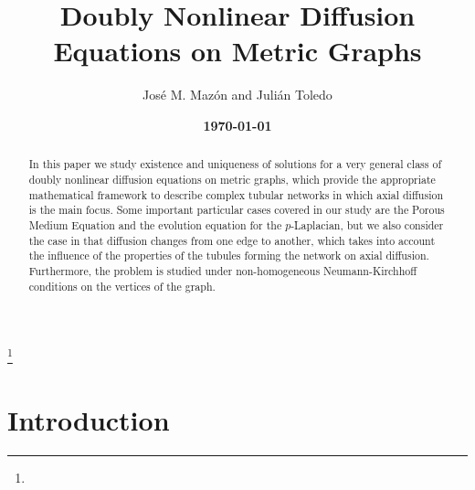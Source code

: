 \documentclass[reqno,12pt]{amsart}
\def\blue{\color{blue}}
\numberwithin{equation}{section} %
\begin{document}
\title[Nonlinear diffusion on metric graphs]{\bf Doubly Nonlinear Diffusion  Equations  on Metric Graphs}


\author[J. M. Maz\'on and J. Toledo ]{José M. Maz\'on and Julián Toledo}




 \address{ J. M. Maz\'{o}n: Departamento de An\'{a}lisis Matem\'{a}tico,
Univ. Valencia, Av. Vicent Andrés Estellés,  19, 46100 Burjassot, Spain.
 {\tt mazon@uv.es}}
\address{J. Toledo: Departamento de An\'{a}lisis Matem\'{a}tico,
Univ. València, Av. Vicent Andrés Estellés,  19, 46100 Burjassot, Spain.
 {\tt toledojj@uv.es}}





\thanks{
}

\setcounter{tocdepth}{1}






\date{\bf\blue\today}


\begin{abstract}
In this paper we study existence and uniqueness of solutions for  a very general class of doubly nonlinear diffusion equations  on metric graphs,  which provide the appropriate mathematical framework to describe complex tubular networks in which axial diffusion is the main focus.  Some important particular cases  covered in our study are the Porous Medium Equation and the evolution equation for the $p$-Laplacian,  but we also consider the case in that diffusion changes from one edge to another,  which takes into account the influence of the properties of the tubules forming the network on axial diffusion. Furthermore, the problem is studied under  non-homogeneous  Neumann-Kirchhoff conditions on the vertices of the graph. 


\end{abstract}


\maketitle




\section{Introduction}
\end{document}
